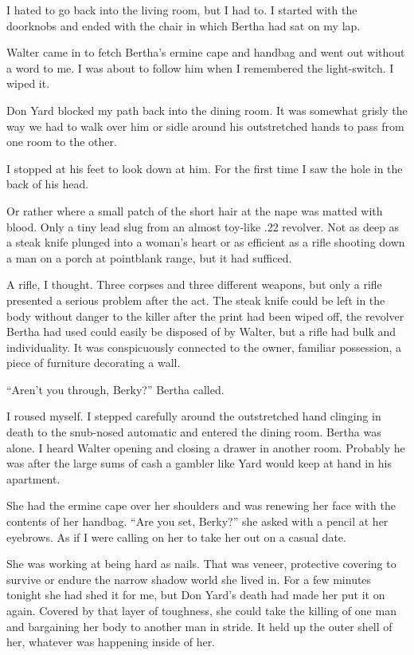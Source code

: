 \documentclass{novel}
\begin{document}
I hated to go back into the living room, but I had to. I started with the doorknobs and ended with the chair in which Bertha had sat on my lap. 

Walter came in to fetch Bertha’s ermine cape and handbag and went out without a word to me. I was about to follow him when I remembered the light-switch. I wiped it.

Don Yard blocked my path back into the dining room. It was somewhat grisly the way we had to walk over him or sidle around his outstretched hands to pass from one room to the other. 

I stopped at his feet to look down at him. For the first time I saw the hole in the back of his head. 

Or rather where a small patch of the short hair at the nape was matted with blood. Only a tiny lead slug from an almost toy-like .22 revolver. Not as deep as a steak knife plunged into a woman’s heart or as efficient as a rifle shooting down a man on a porch at pointblank range, but it had sufficed.

A rifle, I thought. Three corpses and three different weapons, but only a rifle presented a serious problem after the act. The steak knife could be left in the body without danger to the killer after the print had been wiped off, the revolver Bertha had used could easily be disposed of by Walter, but a rifle had bulk and individuality. It was conspicuously connected to the owner, familiar possession, a piece of furniture decorating a wall.

“Aren’t you through, Berky?” Bertha called.

I roused myself. I stepped carefully around the outstretched hand clinging in death to the snub-nosed automatic and entered the dining room. Bertha was alone. I heard Walter opening and closing a drawer in another room. Probably he was after the large sums of cash a gambler like Yard would keep at hand in his apartment.

\scenestars

She had the ermine cape over her shoulders and was renewing her face with the contents of her handbag. “Are you set, Berky?” she asked with a pencil at her eyebrows. As if I were calling on her to take her out on a casual date.

She was working at being hard as nails. That was veneer, protective covering to survive or endure the narrow shadow world she lived in. For a few minutes tonight she had shed it for me, but Don Yard’s death had made her put it on again. Covered by that layer of toughness, she could take the killing of one man and bargaining her body to another man in stride. It held up the outer shell of her, whatever was happening inside of her.
\end{document}

